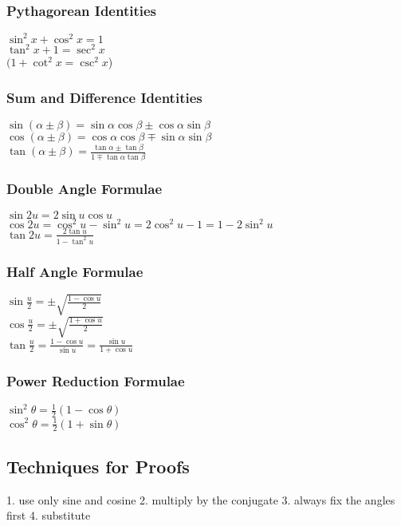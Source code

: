 \subsubsection{Pythagorean Identities}
$\sin^2x + \cos^2x = 1$\\
$\tan^2x + 1 = \sec^2x$\\
$(1 + \cot^2x = \csc^2x$)

\subsubsection{Sum and Difference Identities}
$\sin(\alpha\pm\beta) = \sin\alpha\cos\beta \pm \cos\alpha\sin\beta$\\
$\cos(\alpha\pm\beta) = \cos\alpha\cos\beta \mp \sin\alpha\sin\beta$\\
$\tan(\alpha\pm\beta) = \frac{\tan\alpha\pm\tan\beta}{1\mp\tan\alpha\tan\beta}$

\subsubsection{Double Angle Formulae}
$\sin2u = 2\sin u \cos u$\\
$\cos2u = \cos^2u - \sin^2u = 2\cos^2u - 1 = 1 - 2\sin^2u$\\
$\tan2u = \frac{2\tan u}{1 - \tan^2u}$\\

\subsubsection{Half Angle Formulae}
$\sin\frac{u}{2} = \pm\sqrt{\frac{1-\cos u}{2}}$\\
$\cos\frac{u}{2} = \pm\sqrt{\frac{1+\cos u}{2}}$\\
$\tan\frac{u}{2} = \frac{1-\cos u}{\sin u} = \frac{\sin u}{1+\cos u}$\\


\subsubsection{Power Reduction Formulae}
$\sin^2\theta = \frac{1}{2}(1 - \cos\theta)$\\
$\cos^2\theta  = \frac{1}{2}(1 + \sin\theta)$

\subsection{Techniques for Proofs}
1. use only sine and cosine
2. multiply by the conjugate
3. always fix the angles first
4. substitute 

